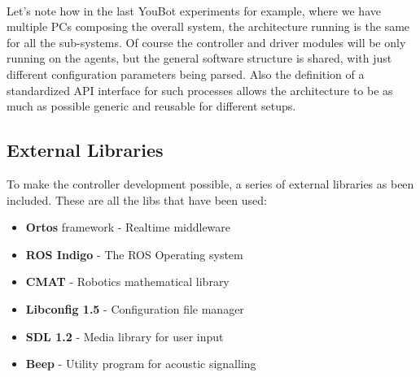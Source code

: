 \paragraph{}
Let's note how in the last YouBot experiments for example, where we have multiple PCs composing the overall system, the architecture running is the same for all the sub-systems. Of course the controller and driver modules will be only running on the agents, but the general software structure is shared, with just different configuration parameters being parsed. Also  the definition of a standardized API interface for such processes allows the architecture to be as much as possible generic and reusable for different setups.

%
%

\subsection{External Libraries}\label{sec:libs}
To make the controller development possible, a series of external libraries as been included. These are all the libs that have been used:

\begin{itemize}
	\setlength\itemsep{-.3em}%
	\item {\bfseries Ortos} framework - Realtime middleware
	\item {\bfseries ROS Indigo} - The ROS Operating system
	\item {\bfseries CMAT} - Robotics mathematical library
	\item {\bfseries Libconfig 1.5} - Configuration file manager
	\item {\bfseries SDL 1.2} - Media library for user input
	\item {\bfseries Beep} - Utility program for acoustic signalling
\end{itemize}

